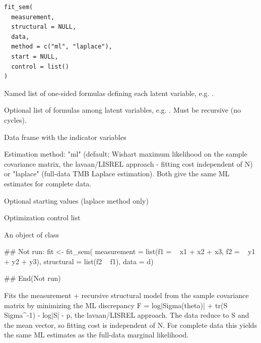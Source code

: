 \documentclass[a4paper]{book}
\begin{document}
%
\begin{Usage}
\begin{verbatim}
fit_sem(
  measurement,
  structural = NULL,
  data,
  method = c("ml", "laplace"),
  start = NULL,
  control = list()
)
\end{verbatim}
\end{Usage}
%
\begin{Arguments}
\begin{ldescription}
\item[\code{measurement}] Named list of one-sided formulas defining each latent
variable, e.g. .

\item[\code{structural}] Optional list of formulas among latent variables, e.g.
. Must be recursive (no cycles).

\item[\code{data}] Data frame with the indicator variables

\item[\code{method}] Estimation method: "ml" (default; Wishart maximum
likelihood on the sample covariance matrix, the lavaan/LISREL
approach - fitting cost independent of N) or "laplace" (full-data
TMB Laplace estimation). Both give the same ML estimates for
complete data.

\item[\code{start}] Optional starting values (laplace method only)

\item[\code{control}] Optimization control list
\end{ldescription}
\end{Arguments}
%
\begin{Value}
An object of class 
\end{Value}
%
\begin{Examples}
\begin{ExampleCode}
## Not run: 
fit <- fit_sem(
  measurement = list(f1 = ~ x1 + x2 + x3, f2 = ~ y1 + y2 + y3),
  structural = list(f2 ~ f1),
  data = d)

## End(Not run)

\end{ExampleCode}
\end{Examples}
%
\begin{Description}
Fits the measurement + recursive structural model from the sample
covariance matrix by minimizing the ML discrepancy
F = log|Sigma(theta)| + tr(S Sigma\textasciicircum{}-1) - log|S| - p,
the lavaan/LISREL approach. The data reduce to S and the mean vector, so
fitting cost is independent of N. For complete data this yields the same
ML estimates as the full-data marginal likelihood.
\end{Description}
\end{document}
